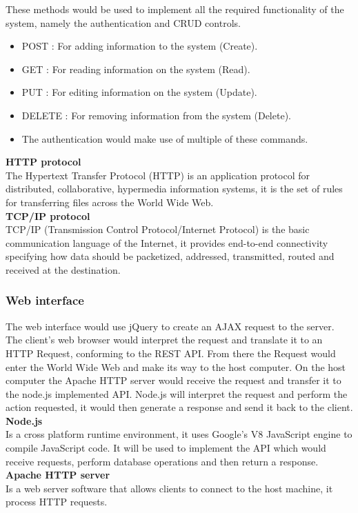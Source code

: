 \documentclass{article}
\begin{document}
These methods would be used to implement all the required functionality of the system, namely the authentication and CRUD controls.\\
\begin{itemize}
	\item POST : For adding information to the system (Create).
	\item GET : For reading information on the system (Read).
	\item PUT : For editing information on the system (Update).
	\item DELETE : For removing information from the system (Delete).
	\item The authentication would make use of multiple of these commands.\\
\end{itemize}
\textbf{HTTP protocol}\\
The Hypertext Transfer Protocol (HTTP) is an application protocol for distributed, collaborative, hypermedia information systems, it is the set of rules for transferring files across the World Wide Web. \\
\textbf{TCP/IP protocol}\\
TCP/IP (Transmission Control Protocol/Internet Protocol) is the basic communication language of the Internet, it provides end-to-end connectivity specifying how data should be packetized, addressed, transmitted, routed and received at the destination. 

\subsubsection*{Web interface}
The web interface would use jQuery to create an AJAX request to the server. The client’s web browser would interpret the request and translate it to an HTTP Request, conforming to the REST API. From there the Request would enter the World Wide Web and make its way to the host computer. On the host computer the Apache HTTP server would receive the request and transfer it to the node.js implemented API. Node.js will interpret the request and perform the action requested, it would then generate a response and send it back to the client.\\
\textbf{Node.js}\\
Is a cross platform runtime environment, it uses Google's V8 JavaScript engine to compile JavaScript code. It will be used to implement the API which would receive requests, perform database operations and then return a response.\\
\textbf{Apache HTTP server}\\
Is a web server software that allows clients to connect to the host machine, it process HTTP requests.
\end{document}
